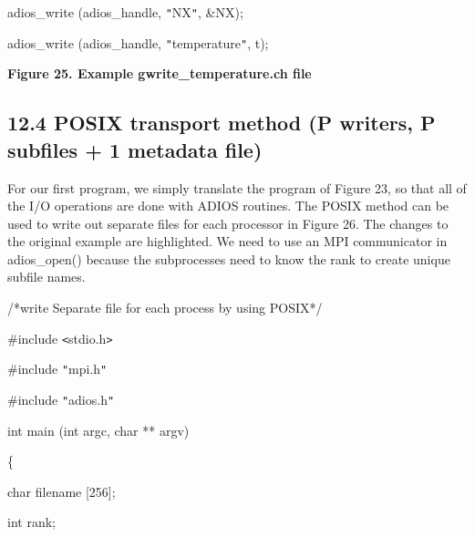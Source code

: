 \vspace{10pt}
adios\_write (adios\_handle, \texttt{"}NX\texttt{"}, \&NX);

\vspace{10pt}
adios\_write (adios\_handle, \texttt{"}temperature\texttt{"}, t);

\label{HRef119579365}\label{HToc144350184}

\vspace{22pt}
\leftskip=18pt
{\color{color20} \textbf{Figure 25. Example gwrite\_temperature.ch file\label{HToc84890294}\label{HToc212016670}\label{HToc212016912}\label{HToc182553443}}}

\vspace{10pt}
\subsection*{{\large 12.4 }{\large \textbf{POSIX transport method (P writers, P 
subfiles + 1 metadata file)}}}

\vspace{10pt}
\leftskip=0pt
For our first program, we simply translate the program of Figure 23, so that all 
of the I/O operations are done with ADIOS routines. The POSIX method can be used 
to write out separate files for each processor in Figure 26. The changes to the 
original example are highlighted. We need to use an MPI communicator in adios\_open() 
because the subprocesses need to know the rank to create unique subfile names. 

\vspace{22pt}
/*write Separate file for each process by using POSIX*/

\vspace{10pt}
\#include \texttt{<}stdio.h\texttt{>}

\vspace{10pt}
\#include \texttt{"}mpi.h\texttt{"}

\vspace{10pt}
{\color{color02} \#include \texttt{"}adios.h\texttt{"}}

\vspace{10pt}
int main (int argc, char ** argv) 

\vspace{10pt}
\{

\vspace{10pt}
\leftskip=18pt
char      \textbf{    } filename [256];

\vspace{10pt}
int              rank;

